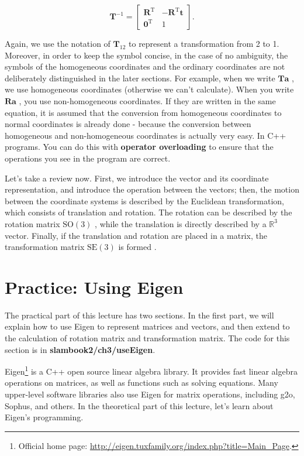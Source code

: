 \begin{equation}
{ \mathbf{T}^{ - 1}} = \left[ {\begin{array}{*{20}{c}}
    {{\mathbf{R}^\mathrm{T}}}&{ - {\mathbf{R}^\mathrm{T}}\mathbf{t}}\\
    {{\mathbf{0}^\mathrm{T}}}&1
    \end{array}} \right].
\end{equation}

Again, we use the notation of $ \mathbf{T}_{12} $ to represent a transformation from 2 to 1. Moreover, in order to keep the symbol concise, in the case of no ambiguity, the symbols of the homogeneous coordinates and the ordinary coordinates are not deliberately distinguished in the later sections. For example, when we write $ \mathbf {T} \mathbf{a} $ , we use homogeneous coordinates (otherwise we can't calculate). When you write $ \mathbf{Ra} $ , you use non-homogeneous coordinates. If they are written in the same equation, it is assumed that the conversion from homogeneous coordinates to normal coordinates is already done - because the conversion between homogeneous and non-homogeneous coordinates is actually very easy. In C++ programs. You can do this with \textbf{operator overloading} to ensure that the operations you see in the program are correct.

Let's take a review now. First, we introduce the vector and its coordinate representation, and introduce the operation between the vectors; then, the motion between the coordinate systems is described by the Euclidean transformation, which consists of translation and rotation. The rotation can be described by the rotation matrix $ \mathrm{SO}( 3 ) $ , while the translation is directly described by a $ \mathbb{R}^ 3 $ vector. Finally, if the translation and rotation are placed in a matrix, the transformation matrix $ \mathrm{SE}( 3 ) $ is formed .

\section{Practice: Using Eigen}
The practical part of this lecture has two sections. In the first part, we will explain how to use Eigen to represent matrices and vectors, and then extend to the calculation of rotation matrix and transformation matrix. The code for this section is in \textbf{slambook2/ch3/useEigen}.

Eigen\footnote{Official home page: \url{http://eigen.tuxfamily.org/index.php?title=Main_Page}. } is a C++ open source linear algebra library. It provides fast linear algebra operations on matrices, as well as functions such as solving equations. Many upper-level software libraries also use Eigen for matrix operations, including g2o, Sophus, and others. In the theoretical part of this lecture, let's learn about Eigen's programming.

